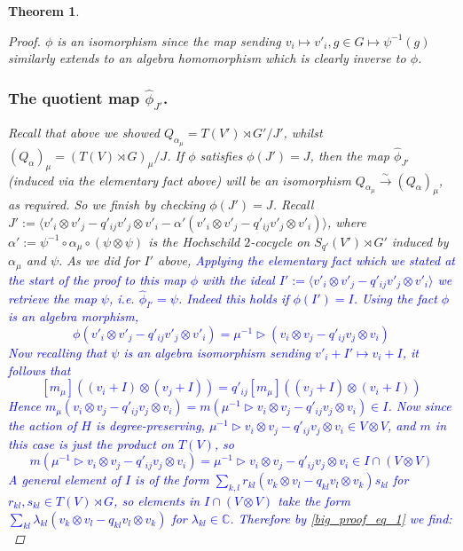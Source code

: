 \documentclass[10pt]{article}
\newcommand{\nt}{\noindent}
\newcommand{\Cc }{\mathbb{C}}
\newcommand{\xrt}{\xrightarrow}
\newtheorem{theorem}[lemma]{Theorem}
\theoremstyle{definition}
\begin{document}
\begin{theorem}
\begin{proof}
\nt $\phi$ is an isomorphism since the map sending $v_i\mapsto v'_i, g\in G\mapsto \psi^{-1}(g)$ similarly extends to an algebra homomorphism which is clearly inverse to $\phi$. 
\fi

\subsubsection{The quotient map \texorpdfstring{$\hat \phi_{J'}$}{phi}.} 
Recall that above we showed $Q_{\alpha_\mu}=T(V')\rtimes G'/J'$, whilst $(Q_\alpha)_\mu=(T(V)\rtimes G)_\mu/J$. If $\phi$ satisfies $\phi(J')=J$, then the map $\hat \phi_{J'}$ (induced via the elementary fact above) will be an isomorphism $Q_{\alpha_\mu}\xrt{\sim} (Q_\alpha)_\mu$, as required. So we finish by checking $\phi(J')=J$. Recall $J':=\langle v'_i\otimes v'_j-q'_{ij}v'_j\otimes v'_i-\alpha'(v'_i\otimes v'_j-q'_{ij}v'_j\otimes v'_i)\rangle$, where $\alpha':=\psi^{-1}\circ \alpha_\mu\circ (\psi\otimes \psi)$ is the Hochschild $2$-cocycle on $S_{q'}(V')\rtimes G'$ induced by $\alpha_\mu$ and $\psi$. As we did for $I'$ above, 
\textcolor{blue}{Applying the elementary fact which we stated at the start of the proof to this map $\phi$ with the ideal $I':=\langle v'_i\otimes v'_j-q'_{ij}v'_j\otimes v'_i\rangle$ we retrieve the map $\psi$, i.e. $\hat \phi_{I'}=\psi$. Indeed this holds if $\phi(I')=I$. Using the fact $\phi$ is an algebra morphism,
\begin{equation}\label{big_proof_eq_2}
\phi(v'_i\otimes v'_j-q'_{ij}v'_j\otimes v'_i)=\mu^{-1}\rhd (v_i\otimes v_j-q'_{ij}v_j\otimes v_i)
\end{equation}
Now recalling that $\psi$ is an algebra isomorphism sending $v'_i+I'\mapsto v_i+I$, it follows that 
$$[m_\mu]((v_i+I)\otimes (v_j+I))=q'_{ij}[m_\mu]((v_j+I)\otimes (v_i+I))$$
Hence $m_\mu(v_i\otimes v_j-q'_{ij}v_j\otimes v_i)=m(\mu^{-1}\rhd v_i\otimes v_j-q'_{ij}v_j\otimes v_i)\in I$. Now since the action of $H$ is degree-preserving, $\mu^{-1}\rhd v_i\otimes v_j-q'_{ij}v_j\otimes v_i\in V\otimes V$, and $m$ in this case is just the product on $T(V)$, so 
\begin{equation}\label{big_proof_eq_1}
m(\mu^{-1}\rhd v_i\otimes v_j-q'_{ij}v_j\otimes v_i)=\mu^{-1}\rhd v_i\otimes v_j-q'_{ij}v_j\otimes v_i\in I\cap (V\otimes V)
\end{equation}
A general element of $I$ is of the form $\sum_{k,l}r_{kl}(v_k\otimes v_l-q_{kl}v_l\otimes v_k)s_{kl}$ for $r_{kl},s_{kl}\in T(V)\rtimes G$, so elements in $I\cap (V\otimes V)$ take the form $\sum_{kl}\lambda_{kl}(v_k\otimes v_l-q_{kl}v_l\otimes v_k)$ for $\lambda_{kl}\in \Cc $. Therefore by \eqref{big_proof_eq_1} we find:
}
\end{proof}
\end{theorem}
\end{document}
